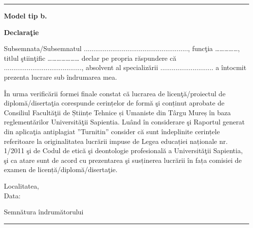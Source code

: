 \documentclass[a4paper, 11pt]{article}
\begin{document}
\begin{titlepage}
\hyphenchar{}
\sloppy

\noindent \rule[10pt]{\textwidth}{1pt}
\begin{flushright}
{\fontsize{12pt}{1} \textbf{Model tip b.}}
\end{flushright}

\vspace{7em}
\begin{center}
{\fontsize{12pt}{1} \textbf{Declaraţie}}\\
\end{center}

\vspace{4em}
\doublespacing

\large Subsemnata/Subsemnatul ......................................................., funcţia ……………, titlul ştiinţific ………………… declar pe propria răspundere că ........................................., absolvent al specializării ............................ a întocmit prezenta lucrare sub îndrumarea mea.
\par În urma verificării formei finale constat că lucrarea de licenţă/proiectul de diplomă/disertaţia corespunde cerințelor de formă şi conținut aprobate de Consiliul Facultăţii de Științe Tehnice și Umaniste din Târgu Mureș în baza reglementărilor Universităţii Sapientia. Luând în considerare şi Raportul generat din aplicaţia antiplagiat ''Turnitin'' consider că sunt îndeplinite cerințele referitoare la originalitatea lucrării impuse de Legea educației naționale nr. 1/2011 şi de Codul de etică şi deontologie profesională a Universităţii Sapientia, şi ca atare sunt de acord cu prezentarea şi susținerea lucrării în fața comisiei de examen de licență/diplomă/disertaţie.

\vspace{5em}
\begin{flushleft}
{\large Localitatea,\\
Data:}
\end{flushleft}

\begin{flushright}
{\large Semnătura îndrumătorului}
\end{flushright}

\end{titlepage}

\begin{titlepage}
\noindent \rule[10pt]{\textwidth}{1pt}
\end{titlepage}
\end{document}
